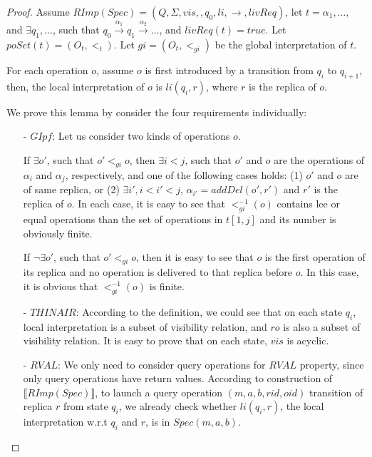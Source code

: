 \begin {proof}

Assume $RImp(Spec) = (Q,\Sigma,vis,,q_0,li,\rightarrow,livReq)$, let $t = \alpha_1, \ldots, $ and $\exists q_1,\ldots$, such that $q_0 {\xrightarrow{\alpha_1}} q_1 {\xrightarrow{\alpha_2}} \ldots$, and $livReq(t) = \textit{true}$. Let $poSet(t)=(O_t,<_t)$. Let $gi = (O_t,<_{gi})$ be the global interpretation of $t$.

For each operation $o$, assume $o$ is first introduced by a transition from $q_i$ to $q_{i+1}$, then, the local interpretation of $o$ is $li(q_i,r)$, where $r$ is the replica of $o$.

We prove this lemma by consider the four requirements individually:

\begin{itemize}
\setlength{\itemsep}{0.5pt}
\item[-] $\textit{GIpf}$: Let us consider two kinds of operations $o$.

If $\exists o'$, such that $o' <_{gi} o$, then $\exists i < j$, such that $o'$ and $o$ are the operations of $\alpha_i$ and $\alpha_j$, respectively, and one of the following cases holds: (1) $o'$ and $o$ are of same replica, or (2) $\exists i', i < i' < j$, $\alpha_{i'}=addDel(o',r')$ and $r'$ is the replica of $o$. In each case, it is easy to see that $<^{-1}_{gi}(o)$ contains lee or equal operations than the set of operations in $t[1,j]$ and its number is obviously finite.

    If $\neg \exists o'$, such that $o' <_{gi} o$, then it is easy to see that $o$ is the first operation of its replica and no operation is delivered to that replica before $o$. In this case, it is obvious that $<^{-1}_{gi}(o)$ is finite.

\item[-] $\textit{THINAIR}$: According to the definition, we could see that on each state $q_i$, local interpretation is a subset of visibility relation, and $ro$ is also a subset of visibility relation. It is easy to prove that on each state, $vis$ is acyclic.

\item[-] $\textit{RVAL}$: We only need to consider query operations for $\textit{RVAL}$ property, since only query operations have return values. According to construction of $\llbracket RImp(Spec) \rrbracket$, to launch a query operation $(m,a,b,rid,oid)$ transition of replica $r$ from state $q_i$, we already check whether $li(q_i,r)$, the local interpretation w.r.t $q_i$ and $r$, is in $Spec(m,a,b)$.


\end{itemize}
\end{proof}
